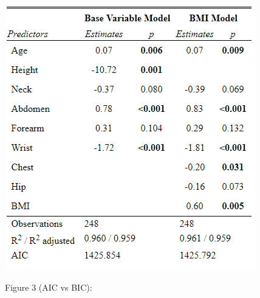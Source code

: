\documentclass[letterpaper,9pt,twocolumn,twoside,]{pinp}
\begin{document}
\includegraphics{BMItest.png}

Figure 3 (AIC vs BIC):
\end{document}
